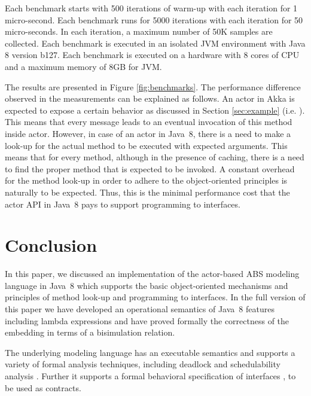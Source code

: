 Each benchmark starts with 500 iterations of warm-up with each iteration for 1 micro-second.
Each benchmark runs for 5000 iterations with each iteration for 50 micro-seconds.
In each iteration, a maximum number of 50K samples are collected.
Each benchmark is executed in an isolated JVM environment with Java 8 version b127.
Each benchmark is executed on a hardware with 8 cores of CPU and a maximum memory of 8GB for JVM.

The results are presented in Figure \ref{fig:benchmarks}.
The performance difference observed in the measurements can be explained as follows.
An actor in Akka is expected to expose a certain behavior as discussed in Section \ref{sec:example} (i.e. ).
This means that every message leads to an eventual invocation of this method inside actor.
However, in case of an actor in Java~8, there is a need to make a look-up for the actual method to be executed with expected arguments. 
This means that for every method, although in the presence of caching, there is a need to find the proper method that is expected to be invoked. 
A constant overhead for the method look-up  in order to adhere to the object-oriented principles is naturally to be expected.
Thus, this is the minimal performance cost that the actor API in Java~8 pays to support  programming to interfaces.

\section{Conclusion}
\label{sec:conclusion}

In this paper, we discussed an implementation of the actor-based ABS modeling language
in Java~8 which supports  the basic object-oriented mechanisms
and principles of method look-up and programming to interfaces.
In the full version of this paper we have developed an operational semantics of Java~8 features including lambda expressions 
and have proved formally the correctness of the embedding in terms of a bisimulation relation.

The underlying modeling language has an executable semantics
and supports a variety of formal analysis techniques, including
deadlock and schedulability analysis \cite{GiachinoGLLW13,JaghooriBCS09}.
Further it supports a formal 
behavioral specification of interfaces \cite{HahnleHJLSSW11}, to be used as contracts.




